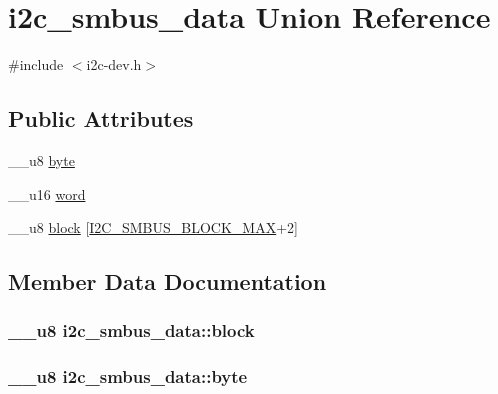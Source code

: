 \hypertarget{unioni2c__smbus__data}{}\section{i2c\+\_\+smbus\+\_\+data Union Reference}
\label{unioni2c__smbus__data}


{\ttfamily \#include $<$i2c-\/dev.\+h$>$}

\subsection*{Public Attributes}
\begin{DoxyCompactItemize}
\item 
\+\_\+\+\_\+u8 \hyperlink{unioni2c__smbus__data_aa0e2604ac3df1abcfe68c95c8d1d8f5b}{byte}
\item 
\+\_\+\+\_\+u16 \hyperlink{unioni2c__smbus__data_adcbf2a0d0c112b6a77b35b3125f15e77}{word}
\item 
\+\_\+\+\_\+u8 \hyperlink{unioni2c__smbus__data_a03f247259d37ce46577c248facd04936}{block} \mbox{[}\hyperlink{smbus-cffi-0_83_82_2include_2linux_2i2c-dev_8h_ac2dd8b77e329bba4a3ca9cd275f9bf50}{I2\+C\+\_\+\+S\+M\+B\+U\+S\+\_\+\+B\+L\+O\+C\+K\+\_\+\+M\+A\+X}+2\mbox{]}
\end{DoxyCompactItemize}


\subsection{Member Data Documentation}
\hypertarget{unioni2c__smbus__data_a03f247259d37ce46577c248facd04936}{}
\subsubsection[{block}]{\setlength{\rightskip}{0pt plus 5cm}\+\_\+\+\_\+u8 i2c\+\_\+smbus\+\_\+data\+::block}\label{unioni2c__smbus__data_a03f247259d37ce46577c248facd04936}
\hypertarget{unioni2c__smbus__data_aa0e2604ac3df1abcfe68c95c8d1d8f5b}{}
\subsubsection[{byte}]{\setlength{\rightskip}{0pt plus 5cm}\+\_\+\+\_\+u8 i2c\+\_\+smbus\+\_\+data\+::byte}\label{unioni2c__smbus__data_aa0e2604ac3df1abcfe68c95c8d1d8f5b}
\hypertarget{unioni2c__smbus__data_adcbf2a0d0c112b6a77b35b3125f15e77}{}
